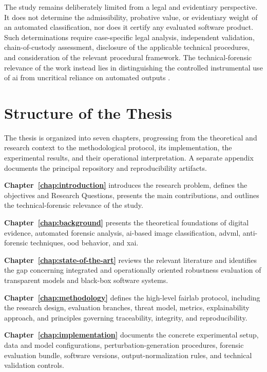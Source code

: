 The study remains deliberately limited from a legal and evidentiary perspective.
It does not determine the admissibility, probative value, or evidentiary weight
of an automated classification, nor does it certify any evaluated software
product. Such determinations require case-specific legal analysis, independent
validation, chain-of-custody assessment, disclosure of the applicable technical
procedures, and consideration of the relevant procedural framework. The
technical-forensic relevance of the work instead lies in distinguishing the
controlled instrumental use of \gls{ai} from uncritical reliance on automated
outputs
\cite{cpp1988,aiact2024,swgde_guidelines}.

\section{Structure of the Thesis}

The thesis is organized into seven chapters, progressing from the theoretical
and research context to the methodological protocol, its implementation, the
experimental results, and their operational interpretation. A separate appendix
documents the principal repository and reproducibility artifacts.

\textbf{Chapter~\ref{chap:introduction}} introduces the research problem,
defines the objectives and Research Questions, presents the main contributions,
and outlines the technical-forensic relevance of the study.

\textbf{Chapter~\ref{chap:background}} presents the theoretical foundations of
digital evidence, automated forensic analysis, \gls{ai}-based image
classification, \gls{advml}, anti-forensic techniques, \gls{ood} behavior, and
\gls{xai}.

\textbf{Chapter~\ref{chap:state-of-the-art}} reviews the relevant literature and
identifies the gap concerning integrated and operationally oriented robustness
evaluation of transparent models and black-box software systems.

\textbf{Chapter~\ref{chap:methodology}} defines the high-level \gls{fairlab}
protocol, including the research design, evaluation branches, threat model,
metrics, explainability approach, and principles governing traceability,
integrity, and reproducibility.

\textbf{Chapter~\ref{chap:implementation}} documents the concrete experimental
setup, data and model configurations, perturbation-generation procedures,
forensic evaluation bundle, software versions, output-normalization rules, and
technical validation controls.

